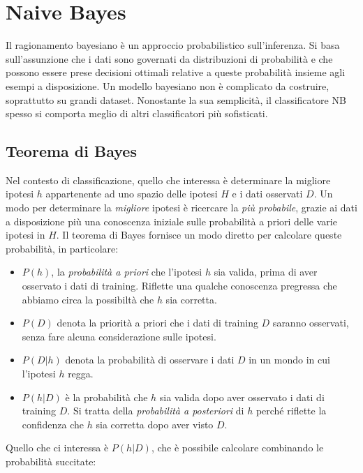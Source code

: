 \chapter{Naive Bayes}

Il ragionamento bayesiano è un approccio probabilistico sull'inferenza. Si basa sull'assunzione che i dati sono governati da distribuzioni di probabilità e che possono essere prese decisioni ottimali relative a queste probabilità insieme agli esempi a disposizione. Un modello bayesiano non è complicato da costruire, soprattutto su grandi dataset. Nonostante la sua semplicità, il classificatore NB spesso si comporta meglio di altri classificatori più sofisticati\cite{Domingos:1997:OSB:274158.274160}.

\section{Teorema di Bayes}
Nel contesto di classificazione, quello che interessa è determinare la migliore ipotesi $h$ appartenente ad uno spazio delle ipotesi $H$ e i dati osservati $D$. Un modo per determinare la \emph{migliore} ipotesi è ricercare la \emph{più probabile}, grazie ai dati a disposizione più una conoscenza iniziale sulle probabilità a priori delle varie ipotesi in $H$\cite{Mitchell:1997:ML:541177}. Il teorema di Bayes fornisce un modo diretto per calcolare queste probabilità, in particolare:

\begin{itemize}
	\item $P(h)$, la \emph{probabilità a priori} che l'ipotesi $h$ sia valida, prima di aver osservato i dati di training. Riflette una qualche conoscenza pregressa che abbiamo circa la possibiltà che $h$ sia corretta.
	\item $P(D)$ denota la priorità a priori che i dati di training $D$ saranno osservati, senza fare alcuna considerazione sulle ipotesi.
	\item $P(D|h)$ denota la probabilità di osservare i dati $D$ in un mondo in cui l'ipotesi $h$ regga.
	\item $P(h|D)$ è la probabilità che $h$ sia valida dopo aver osservato i dati di training $D$. Si tratta della \emph{probabilità a posteriori} di $h$ perché riflette la confidenza che $h$ sia corretta dopo aver visto $D$.
\end{itemize}

Quello che ci interessa è $P(h|D)$, che è possibile calcolare combinando le probabilità succitate:

